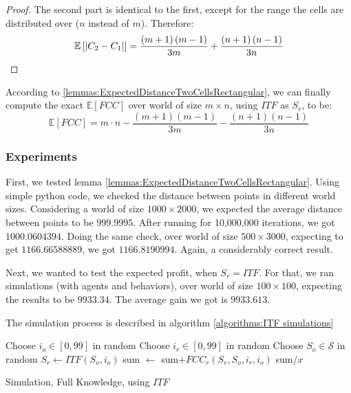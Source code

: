 \documentclass[a4paper,10pt]{article}
\newcommand\rob{\ensuremath{r}\xspace}
\newcommand\opp{\ensuremath{o}\xspace}
\newcommand{\fcc}{\ensuremath{FCC}\xspace}
\newcommand{\itf}{\ensuremath{ITF}\xspace}
\DeclarePairedDelimiter\abs{\lvert}{\rvert}%
\begin{document}
\begin{proof}
The second part is identical to the first, except for the range the cells are distributed over ($n$ instead of $m$). Therefore:
\[\mathbb{E}\left[\abs*{C_2-C_1}\right]=\frac{\left(m+1\right)\left(m-1\right)}{3m}+\frac{\left(n+1\right)\left(n-1\right)}{3n}\]

\end{proof}

According to \ref{lemmas:ExpectedDistanceTwoCellsRectangular}, we can finally compute the exact $\mathbb{E}[\fcc]$ over world of size $m\times n$, using \itf as $S_{\rob}$, to be: \[\mathbb{E}\left[\fcc\right]=m\cdot n-\frac{\left(m+1\right)\left(m-1\right)}{3m}-\frac{\left(n+1\right)\left(n-1\right)}{3n}\]

\subsubsection{Experiments}
First, we tested lemma \ref{lemmas:ExpectedDistanceTwoCellsRectangular}. Using simple python code, we checked the distance between points in different world sizes. Considering a world of size $1000 \times 2000$, we expected the average distance between points to be $999.9995$. After running for 10,000,000 iterations, we got $1000.0604394$.
Doing the same check, over world of size $500\times 3000$, expecting to get $1166.66588889$, we got $1166.8190994$. Again, a considerably correct result.

Next, we wanted to test the expected profit, when $S_{\rob} = \itf$. For that, we ran simulations (with agents and behaviors), over world of size $100 \times 100$, expecting the results to be $9933.34$.
The average gain we got is $9933.613$.

The simulation process is described in algorithm \ref{algorithms:ITF simulations}
\begin{algorithm}
\begin{algorithmic}
    	\STATE Choose $i_{\opp}\in \left[0,99\right]$ in random
        \STATE Choose $i_{\rob}\in \left[0,99\right]$ in random
        \STATE Choose $S_{\opp}\in \mathcal{S}$ in random
        \STATE $S_{\rob} \leftarrow \itf\left(S_{\opp}, i_{\opp}\right)$
    	\STATE sum $\leftarrow $ sum$+ {\fcc}_{\rob}(S_{\rob},S_{\opp}, i_{\rob}, i_{\opp})$
    \ENDFOR
    \RETURN sum$/x$
  
\end{algorithmic}
\caption{Simulation, Full Knowledge, using \itf\label{algorithms:ITF simulations}}
\end{algorithm}
\end{document}
